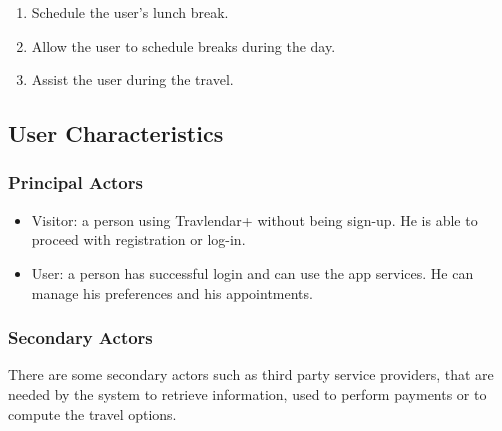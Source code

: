 \begin{enumerate}
  	\item Schedule the user’s lunch break.
	
  	\item Allow the user to schedule breaks during the day.

	
  	\item Assist the user during the travel.
	
\end{enumerate}

\subsection{User Characteristics}

\subsubsection{Principal Actors}

\renewcommand{\labelitemi}{$-$}
\begin{itemize}
\item
Visitor: a person using Travlendar+ without being sign-up. He is able to proceed with registration or log-in.
\item
User: a person has successful login and can use the app services. He can manage his preferences and his appointments.
\end{itemize}

\subsubsection{Secondary Actors}
There are some secondary actors such as third party service providers, that are needed by the system to retrieve information, used to perform payments or to compute the travel options. 
